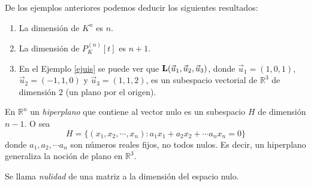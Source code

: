 \bigskip


De los ejemplos anteriores podemos deducir los siguientes resultados:

\bigskip

\begin{enumerate}



\item

La dimensión de $K^{n}$  es $n$.
\item

La dimensión  de $P_K^{(n)}\left[t\right]$  es $n+1$.

\item
En el Ejemplo \ref{ejuis}  se puede ver que  $\bold{L}(\vec{u}_1,\vec{u}_2,  \vec{u}_3)$, donde $\vec{u}_1=(1,0,1)$, $\vec{u}_2=(-1,1,0)$ y $\vec{u}_3=(1,1,2)$,  es un subespacio vectorial de $\mathbb{R}^3$ de dimensión $2$ (un plano por el origen).

\end{enumerate}

\bigskip

\bigskip

\begin{remark}
    En $\mathbb{R}^n$ un \textit{hiperplano} que contiene al vector nulo es un subespacio $H$ de dimensión $n-1$. O sea  
    $$ H=\{ (x_1,x_2, \cdots, x_n): a_1x_1+a_2x_2 +  \cdots a_nx_n=0\}$$
\noindent
    donde $a_1, a_2, \cdots a_n$ son números reales fijos, no todos nulos. Es decir, un hiperplano  generaliza la noción de plano en $\mathbb{R}^3$.
\end{remark}

\bigskip

\begin{remark}
Se llama \textit{nulidad} de una matriz a la dimensión del espacio nulo. 
\end{remark}
\bigskip

